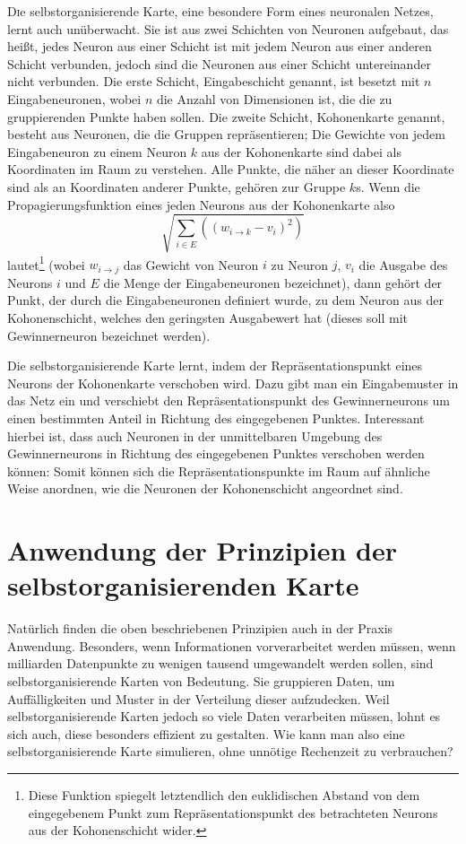 \documentclass[twoside,a4paper,draft]{article}
\newcommand{\commonlettrine}[1]{\lettrine[nindent=0em,lines=2]{#1}}
\begin{document}
\begin{multicols}{2}
\commonlettrine{D}ie selbstorganisierende Karte, eine besondere Form eines neuronalen Netzes, lernt auch unüberwacht. Sie ist aus zwei Schichten von Neuronen aufgebaut, das heißt, jedes Neuron aus einer Schicht ist mit jedem Neuron aus einer anderen Schicht verbunden, jedoch sind die Neuronen aus einer Schicht untereinander nicht verbunden. Die erste Schicht, Eingabeschicht genannt, ist besetzt mit \(n\) Eingabeneuronen, wobei \(n\) die Anzahl von Dimensionen ist, die die zu gruppierenden Punkte haben sollen. Die zweite Schicht, Kohonenkarte genannt, besteht aus Neuronen, die die Gruppen repräsentieren; Die Gewichte von jedem Eingabeneuron zu einem Neuron \(k\) aus der Kohonenkarte sind dabei als Koordinaten im Raum zu verstehen. Alle Punkte, die näher an dieser Koordinate sind als an Koordinaten anderer Punkte, gehören zur Gruppe \(k\)s. Wenn die Propagierungsfunktion eines jeden Neurons aus der Kohonenkarte also
\[
\sqrt{\sum_{i\in{}E} \left((w_{i\rightarrow{}k} - v_i)^2\right)}
\]
lautet\footnote{Diese Funktion spiegelt letztendlich den euklidischen Abstand von dem eingegebenem Punkt zum Repräsentationspunkt des betrachteten Neurons aus der Kohonenschicht wider.} (wobei \(w_{i\rightarrow{}j}\) das Gewicht von Neuron \(i\) zu Neuron \(j\), \(v_i\) die Ausgabe des Neurons \(i\) und \(E\) die Menge der Eingabeneuronen bezeichnet), dann gehört der Punkt, der durch die Eingabeneuronen definiert wurde, zu dem Neuron aus der Kohonenschicht, welches den geringsten Ausgabewert hat (dieses soll mit \glqq{}Gewinnerneuron\grqq{} bezeichnet werden).

Die selbstorganisierende Karte lernt, indem der Repräsentationspunkt eines Neurons der Kohonenkarte verschoben wird. Dazu gibt man ein Eingabemuster in das Netz ein und verschiebt den Repräsentationspunkt des Gewinnerneurons um einen bestimmten Anteil in Richtung des eingegebenen Punktes. Interessant hierbei ist, dass auch Neuronen in der unmittelbaren Umgebung des Gewinnerneurons in Richtung des eingegebenen Punktes verschoben werden können: Somit können sich die Repräsentationspunkte im Raum auf ähnliche Weise anordnen, wie die Neuronen der Kohonenschicht angeordnet sind.

\section{Anwendung der Prinzipien der selbstorganisierenden Karte}

Natürlich finden die oben beschriebenen Prinzipien auch in der Praxis Anwendung. Besonders, wenn Informationen vorverarbeitet werden müssen, wenn milliarden Datenpunkte zu wenigen tausend umgewandelt werden sollen, sind selbstorganisierende Karten von Bedeutung. Sie gruppieren Daten, um Auffälligkeiten und Muster in der Verteilung dieser aufzudecken. Weil selbstorganisierende Karten jedoch so viele Daten verarbeiten müssen, lohnt es sich auch, diese besonders effizient zu gestalten. Wie kann man also eine selbstorganisierende Karte simulieren, ohne unnötige Rechenzeit zu verbrauchen?


\end{multicols}
\end{document}
